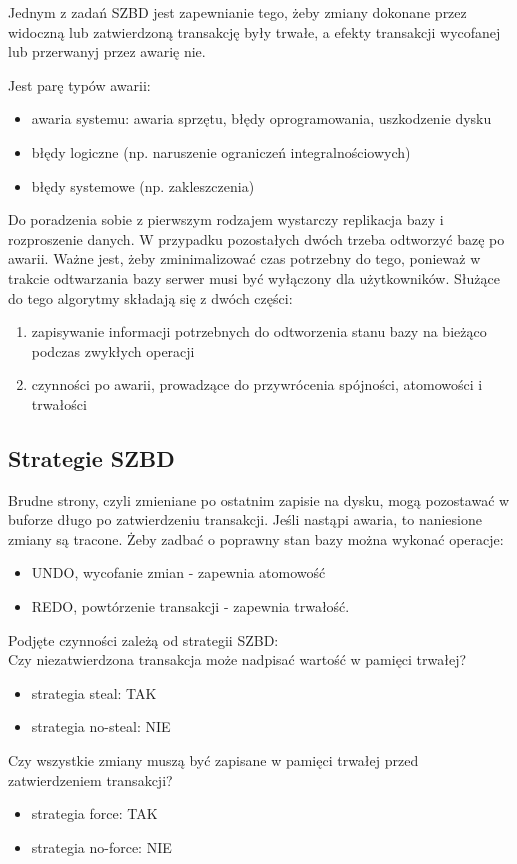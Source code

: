 Jednym z zadań SZBD jest zapewnianie tego, żeby zmiany dokonane przez widoczną lub zatwierdzoną transakcję były trwałe, a efekty transakcji wycofanej lub przerwanyj przez awarię nie.

Jest parę typów awarii:
\begin{itemize}
    \item awaria systemu: awaria sprzętu, błędy oprogramowania, uszkodzenie dysku
    \item błędy logiczne (np. naruszenie ograniczeń integralnościowych)
    \item błędy systemowe (np. zakleszczenia)
\end{itemize}
Do poradzenia sobie z pierwszym rodzajem wystarczy replikacja bazy i rozproszenie danych. W przypadku pozostałych dwóch trzeba odtworzyć bazę po awarii.
Ważne jest, żeby zminimalizować czas potrzebny do tego, ponieważ w trakcie odtwarzania bazy serwer musi być wyłączony dla użytkowników.
Służące do tego algorytmy składają się z dwóch części:
\begin{enumerate}
    \item zapisywanie informacji potrzebnych do odtworzenia stanu bazy na bieżąco podczas zwykłych operacji
    \item czynności po awarii, prowadzące do przywrócenia spójności, atomowości i trwałości
\end{enumerate}

\subsection*{Strategie SZBD}
Brudne strony, czyli zmieniane po ostatnim zapisie na dysku, mogą pozostawać w buforze długo po zatwierdzeniu transakcji. Jeśli nastąpi awaria, to naniesione zmiany są tracone.
Żeby zadbać o poprawny stan bazy można wykonać operacje:
\begin{itemize}
    \item UNDO, wycofanie zmian - zapewnia atomowość
    \item REDO, powtórzenie transakcji - zapewnia trwałość.
\end{itemize}
Podjęte czynności zależą od strategii SZBD: \\
Czy niezatwierdzona transakcja może nadpisać wartość w pamięci trwałej? \\
\begin{itemize}
    \item strategia steal: TAK
    \item strategia no-steal: NIE
\end{itemize}
Czy wszystkie zmiany muszą być zapisane w pamięci trwałej przed zatwierdzeniem transakcji?
\begin{itemize}
    \item strategia force: TAK
    \item strategia no-force: NIE
\end{itemize}

